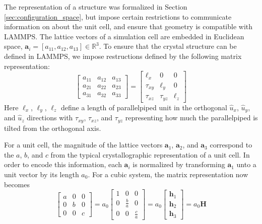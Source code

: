 The representation of a structure was formalized in Section \ref{sec:configuration_space}, but impose certain restrictions to communicate information on about the unit cell, and ensure that geometry is compatible with LAMMPS.
The lattice vectors of a simulation cell are embedded in Euclidean space,  $\bm{a}_i = [a_{11}, a_{12}, a_{13}] \in \mathbb{R}^3$.  To ensure that the crystal structure can be defined in LAMMPS, we impose restructions defined by the following matrix representation:
\begin{equation}
	\begin{bmatrix}
		a_{11} & a_{12} & a_{13} \\
		a_{21} & a_{22} & a_{23} \\
		a_{31} & a_{32} & a_{33}
	\end{bmatrix}
	=
	\begin{bmatrix}
		\ell_x    & 0         & 0     \\
		\tau_{xy} & \ell_y    & 0     \\
		\tau_{xz} & \tau_{yz} & \ell_z
	\end{bmatrix}
\end{equation}
Here $\ell_x$, $\ell_y$, $\ell_z$ define a length of parallelpiped unit in the orthogonal $\hat{u}_x$, $\hat{u}_y$, and $\hat{u}_z$ directions with $\tau_{xy}$, $\tau_{xz}$, and $\tau_{yz}$ representing how much the parallelpiped is tilted from the orthogonal axis.

For a unit cell, the magnitude of the lattice vectors $\bm{a}_1$, $\bm{a}_2$, and $\bm{a}_3$ correspond to the $a$,  $b$, and $c$ from the typical crystallographic representation of a unit cell.  In order to encode this information, each $\bm{a}_i$ is normalized by transforming $\bm{a}_1$ unto a unit vector by its length $a_0$.  For a cubic system, the matrix representation now becomes
\begin{equation}
\label{eq:pypospack_lattice_vector}
	\begin{bmatrix}
		a & 0 & 0 \\
		0 & b & 0 \\
		0 & 0 & c
	\end{bmatrix}
	=
	a_0
	\begin{bmatrix}
		1 & 0 & 0 \\
		0 & \frac{b}{a} & 0 \\
		0 & 0 & \frac{c}{a}
	\end{bmatrix}
	=
	a_0 \begin{bmatrix}
				\bm{h}_1 \\
				\bm{h}_2 \\
				\bm{h}_3
			\end{bmatrix}
	=
	a_0 \bm{H}
\end{equation}

